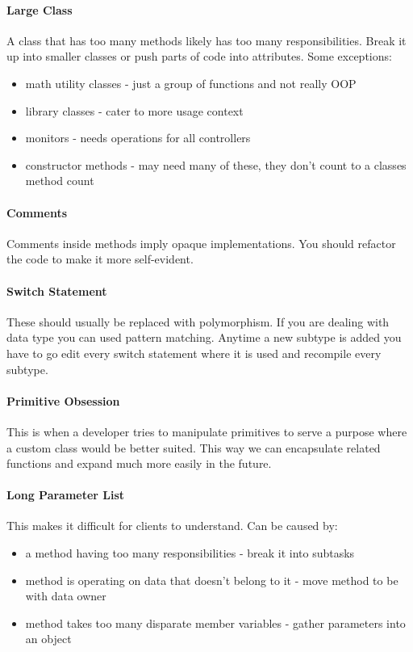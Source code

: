 \documentclass{article}
\begin{document}
\paragraph{Large Class} %
\label{par:large_class}
A class that has too many methods likely has too many responsibilities. Break it up into smaller classes or push parts of code into attributes. Some exceptions:
\begin{itemize}
    \item math utility classes - just a group of functions and not really OOP
    \item library classes - cater to more usage context
    \item monitors - needs operations for all controllers
    \item constructor methods - may need many of these, they don't count to a classes method count
\end{itemize}

\paragraph{Comments} %
\label{par:comments}
Comments inside methods imply opaque implementations. You should refactor the code to make it more self-evident.

\paragraph{Switch Statement} %
\label{par:switch_statement}
These should usually be replaced with polymorphism. If you are dealing with data type you can used pattern matching. Anytime a new subtype is added you have to go edit every switch statement where it is used and recompile every subtype.

\paragraph{Primitive Obsession} %
\label{par:primitive_obsession}
This is when a developer tries to manipulate primitives to serve a purpose where a custom class would be better suited. This way we can encapsulate related functions and expand much more easily in the future.

\paragraph{Long Parameter List} %
\label{par:long_parameter_list}
This makes it difficult for clients to understand. Can be caused by:
\begin{itemize}
    \item a method having too many responsibilities -  break it into subtasks
    \item method is operating on data that doesn't belong to it - move method to be with data owner
    \item method takes too many disparate member variables - gather parameters into an object
\end{itemize}
\end{document}
